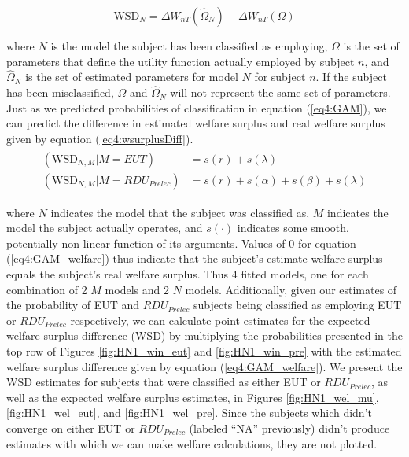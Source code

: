 \documentclass[../main.tex]{subfiles}
\begin{document}
\begin{equation}
	\label{eq4:wsurplusDiff}
	\text{WSD}_N = \Delta W_{nT}(\hat{\Omega}_N) - \Delta W_{nT}(\Omega)
\end{equation}

\noindent where $N$ is the model the subject has been classified as employing, $\Omega$ is the set of parameters that define the utility function actually employed by subject $n$, and $\hat{\Omega}_N$ is the set of estimated parameters for model $N$ for subject $n$.
If the subject has been misclassified, $\Omega$ and $\hat{\Omega}_N$ will not represent the same set of parameters.
Just as we predicted probabilities of classification in equation (\ref{eq4:GAM}), we can predict the difference in estimated welfare surplus and real welfare surplus given by equation (\ref{eq4:wsurplusDiff}).
\begin{align}
	\label{eq4:GAM_welfare}
	\begin{split}
		(\text{WSD}_{N,M} | M = EUT)                   &= s(r) + s(\lambda)\\
		(\text{WSD}_{N,M} | M = \mathit{RDU_{Prelec}}) &= s(r) + s(\alpha) + s(\beta) + s(\lambda)
	\end{split}
\end{align}

\noindent where $N$ indicates the model that the subject was classified as, $M$ indicates the model the subject actually operates, and $s(\cdot)$ indicates some smooth, potentially non-linear function of its arguments.
Values of 0 for equation (\ref{eq4:GAM_welfare}) thus indicate that the subject's estimate welfare surplus equals the subject's real welfare surplus.
Thus 4 fitted models, one for each combination of 2 $M$ models and 2 $N$ models.
Additionally, given our estimates of the probability of EUT and $\mathit{RDU_{Prelec}}$ subjects being classified as employing EUT or $\mathit{RDU_{Prelec}}$ respectively, we can calculate point estimates for the expected welfare surplus difference (WSD) by multiplying the probabilities presented in the top row of Figures \ref{fig:HN1_win_eut} and \ref{fig:HN1_win_pre} with the estimated welfare surplus difference given by equation (\ref{eq4:GAM_welfare}).
We present the WSD estimates for subjects that were classified as either EUT or $\mathit{RDU_{Prelec}}$, as well as the expected welfare surplus estimates, in Figures \ref{fig:HN1_wel_mu}, \ref{fig:HN1_wel_eut}, and \ref{fig:HN1_wel_pre}.
Since the subjects which didn't converge on either EUT or $\mathit{RDU_{Prelec}}$ (labeled \enquote{NA} previously) didn't produce estimates with which we can make welfare calculations, they are not plotted.
\end{document}
